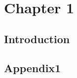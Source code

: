 \chapter[Chapter 1]{Chapter 1 \label{ch:chapter1}}
\let\thefootnote\relax{}

%
%

\section{Introduction}

\cite{dummy-citation}




\setcounter{section}{0}%
\renewcommand\thesection{\thechapter.\Alph{section}}

%
% 
\section{Appendix1}
\label{appendix:one}

\renewcommand\thesection{\thechapter.\arabic{section}}

